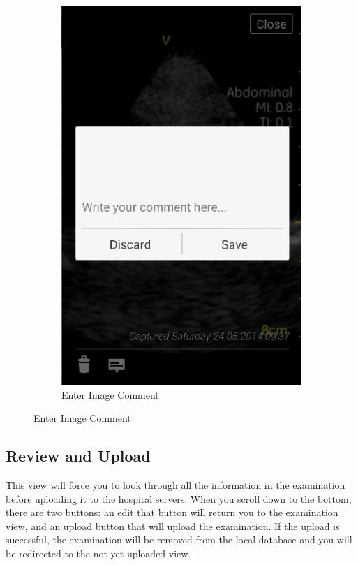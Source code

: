 \begin{figure}[H]
\begin{subfigure}[b]{0.49\textwidth}
        \includegraphics[width=\textwidth]{img/interface/7-ViewImageComment.png}
        \caption*{Enter Image Comment}
        \label{fig:07viewimagecomment}
    \end{subfigure}
\end{figure}

\newpage
\subsection*{Review and Upload}
This view will force you to look through all the information in the examination before uploading it to the hospital servers. When you scroll down to the bottom, there are two buttons: an edit that button will return you to the examination view, and an upload button that will upload the examination. If the upload is successful, the examination will be removed from the local database and you will be redirected to the not yet uploaded view.

